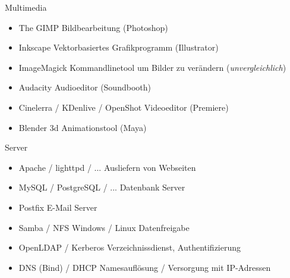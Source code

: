 \documentclass[aspectratio=43]{beamer}
\begin{document}
\begin{frame} 

	\begin{block}{Multimedia} 
	\begin{itemize}
	\item The GIMP
	\newline Bildbearbeitung (Photoshop)
	\item Inkscape
	\newline Vektorbasiertes Grafikprogramm (Illustrator)
	\item ImageMagick
	\newline Kommandlinetool um Bilder zu verändern (\textit{unvergleichlich})
	\item Audacity
	\newline Audioeditor (Soundbooth)
	\item Cinelerra / KDenlive / OpenShot
	\newline Videoeditor (Premiere)
	\item Blender
	\newline 3d Animationstool (Maya) 
	\end{itemize}

	\end{block}
	
\end{frame}

\begin{frame} 

	\begin{block}{Server} 
	\begin{itemize}
	\item Apache / lighttpd / ...
	\newline Ausliefern von Webseiten
	\item MySQL / PostgreSQL / ...
	\newline Datenbank Server
	\item Postfix
	\newline E-Mail Server
	\item Samba / NFS
	\newline Windows / Linux Datenfreigabe
	\item OpenLDAP / Kerberos
	\newline Verzeichnissdienst, Authentifizierung
	\item DNS (Bind) / DHCP
	\newline Namesauflösung / Versorgung mit IP-Adressen
	\end{itemize}

	\end{block}
	
\end{frame}
\end{document}
